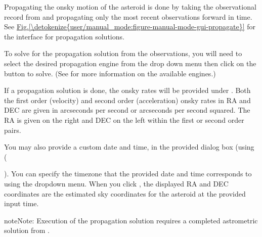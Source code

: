 \documentclass[letterpaper,11pt,english]{sphinxmanual}
\begin{document}
\sphinxAtStartPar
Propagating the on\sphinxhyphen{}sky motion of the asteroid is done by taking the
observational record from
{\hyperref[\detokenize{user/manual_mode:user-manual-mode-procedure-asteroid-observation-record}]{}} and propagating
only the most recent observations forward in time. See
\hyperref[\detokenize{user/manual_mode:figure-manual-mode-gui-propagate}]{Fig.\@ \ref{\detokenize{user/manual_mode:figure-manual-mode-gui-propagate}}} for the interface for propagation
solutions.

\sphinxAtStartPar
To solve for the propagation solution from the observations, you will need to
select the desired propagation engine from the drop down menu then click on the
 button to solve.
(See {\hyperref[\detokenize{technical/architecture/services_engines:technical-architecture-services-engines}]{}} for more information on
the available engines.)

\sphinxAtStartPar
If a propagation solution is done, the on\sphinxhyphen{}sky rates will be provided under
. Both the first order (velocity) and
second order (acceleration) on\sphinxhyphen{}sky rates in RA and DEC are given in arcseconds
per second or arcseconds per second squared. The RA is given on the right and
DEC on the left within the first or second order pairs.

\sphinxAtStartPar
You may also provide a custom date and time, in the provided dialog box (using
(%
\begin{footnote}[7]\sphinxAtStartFootnote
{}
%
\end{footnote}). You
can specify the timezone that the provided date and time corresponds to using
the dropdown menu. When you click , the displayed RA
and DEC coordinates are the estimated sky coordinates for the asteroid at the
provided input time.

\begin{sphinxadmonition}{note}{Note:}
\sphinxAtStartPar
Execution of the propagation solution requires a completed astrometric
solution from
{\hyperref[\detokenize{user/manual_mode:user-manual-mode-procedure-find-asteroid-location-compute-astrometric-solution}]{}}.
\end{sphinxadmonition}
\end{document}
